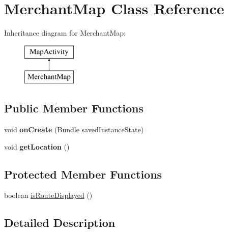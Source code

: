 \hypertarget{classapp_1_1localization_1_1_merchant_map}{\section{Merchant\-Map Class Reference}
\label{classapp_1_1localization_1_1_merchant_map}
}
Inheritance diagram for Merchant\-Map\-:\begin{figure}[H]
\begin{center}
\leavevmode
\includegraphics[height=2.000000cm]{classapp_1_1localization_1_1_merchant_map}
\end{center}
\end{figure}
\subsection*{Public Member Functions}
\begin{DoxyCompactItemize}
\item 
\hypertarget{classapp_1_1localization_1_1_merchant_map_a85e87cb5ced88dff7c8173ecc4f636d1}{void {\bfseries on\-Create} (Bundle saved\-Instance\-State)}\label{classapp_1_1localization_1_1_merchant_map_a85e87cb5ced88dff7c8173ecc4f636d1}

\item 
\hypertarget{classapp_1_1localization_1_1_merchant_map_a8d6a2ed4f43e4f93ddd846c3ed28b383}{void {\bfseries get\-Location} ()}\label{classapp_1_1localization_1_1_merchant_map_a8d6a2ed4f43e4f93ddd846c3ed28b383}

\end{DoxyCompactItemize}
\subsection*{Protected Member Functions}
\begin{DoxyCompactItemize}
\item 
boolean \hyperlink{classapp_1_1localization_1_1_merchant_map_a294a4986d39cff22365b36850bb2a0ca}{is\-Route\-Displayed} ()
\end{DoxyCompactItemize}


\subsection{Detailed Description}


